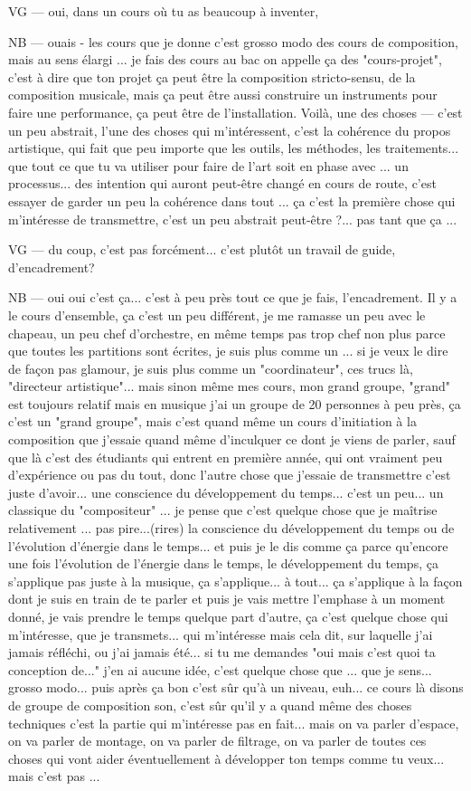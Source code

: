 VG — oui, dans un cours où tu as beaucoup à inventer, 

NB —  ouais - les cours que je donne c'est grosso modo des cours de composition, mais au sens élargi ... je fais des cours au bac on appelle ça des "cours-projet", c'est à dire que ton projet ça peut être la composition stricto-sensu, de la composition musicale, mais ça peut être aussi construire un instruments pour faire une performance, ça peut être de l'installation. Voilà, une des choses — c'est un peu abstrait, l'une des choses qui m'intéressent, c'est la cohérence du propos artistique, qui fait que peu importe que les outils, les méthodes, les traitements... que tout ce que tu va utiliser pour faire de l'art soit en phase avec ... un processus... des intention qui auront peut-être changé en cours de route, c'est essayer de garder un peu la cohérence dans tout ... ça c'est la première chose qui m'intéresse de transmettre, c'est un peu abstrait peut-être ?...  pas tant que ça ...

VG — du coup, c'est pas forcément... c'est plutôt un travail de guide, d'encadrement? 

NB — oui oui c'est ça... c'est à peu près tout ce que je fais, l'encadrement. Il y a le cours d'ensemble, ça c'est un peu différent, je me ramasse un peu avec le chapeau, un peu chef d'orchestre, en même temps pas trop chef non plus parce que toutes les partitions sont écrites, je suis plus comme un ... si je veux le dire de façon pas glamour, je suis plus comme un "coordinateur", ces trucs là, "directeur artistique"... mais sinon même mes cours, mon grand groupe, "grand" est toujours relatif mais en musique j'ai un groupe de 20 personnes à peu près, ça c'est un "grand groupe",  mais c'est quand même un cours d'initiation à la composition que j'essaie quand même d'inculquer ce dont je viens de parler, sauf que là c'est des étudiants qui entrent en  première année, qui ont vraiment peu d'expérience ou pas du tout, donc l'autre chose que j'essaie de transmettre c'est juste d'avoir... une conscience du développement du temps... c'est un peu... un classique du "compositeur" ... je pense que c'est quelque chose que je maîtrise relativement ... pas pire...(rires) la conscience du développement du temps ou de l'évolution d'énergie dans le temps... et puis je le dis comme ça parce qu'encore une fois l'évolution de l'énergie dans le temps, le développement du temps, ça s'applique pas juste à la musique, ça s'applique... à tout... ça s'applique à la façon dont je suis en train de te parler et puis je vais mettre l'emphase à un moment donné, je vais prendre le temps quelque part d'autre, ça c'est quelque chose qui m'intéresse, que je transmets... qui m'intéresse mais cela dit, sur laquelle j'ai jamais réfléchi, ou j'ai jamais été... si tu me demandes "oui  mais c'est quoi ta conception de..." j'en ai aucune idée, c'est quelque chose que ... que je sens... grosso modo... puis après ça bon c'est sûr qu'à un niveau, euh... ce cours là disons de groupe de composition son, c'est sûr qu'il y a quand même des choses techniques c'est la partie qui m'intéresse pas en fait... mais on va parler d'espace, on va parler de montage, on va parler de filtrage, on va parler de toutes ces choses qui vont aider éventuellement à développer ton temps comme tu veux... mais c'est pas ...

